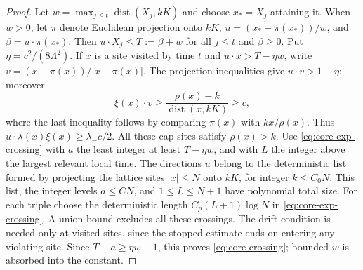 \begin{proof}
Let $w=\max_{j\leq t}\operatorname{dist}(X_j,kK)$ and choose $x_*=X_j$
attaining it. When $w>0$, let $\pi$ denote Euclidean projection onto $kK$,
$u=(x_*-\pi(x_*))/w$, and $\beta=u\cdot\pi(x_*)$.
Then $u\cdot X_j\leq T:=\beta+w$ for all $j\leq t$ and $\beta\geq0$.
Put $\eta=c^2/(8\Lambda^2)$. If $x$ is a site visited by time $t$
and $u\cdot x>T-\eta w$, write $v=(x-\pi(x))/|x-\pi(x)|$.
The projection inequalities give $u\cdot v>1-\eta$; moreover
\[
 \xi(x)\cdot v\geq
 \frac{\rho(x)-k}{\operatorname{dist}(x,kK)}\geq c,
\]
where the last inequality follows by comparing $\pi(x)$ with
$kx/\rho(x)$. Thus $u\cdot\lambda(x)\xi(x)\geq\lambda_-c/2$.
All these cap sites satisfy $\rho(x)>k$.
Use \eqref{eq:core-exp-crossing} with $a$ the least integer at least
$T-\eta w$, and with $L$ the integer above the largest relevant local time.
The directions $u$ belong to the deterministic list formed by projecting
the lattice sites $|x|\leq N$ onto $kK$, for integer $k\leq C_0N$.
This list, the integer levels $a\leq CN$, and $1\leq L\leq N+1$ have
polynomial total size. For each triple choose the deterministic length
$C_p(L+1)\log N$ in \eqref{eq:core-exp-crossing}. A union bound excludes
all these crossings. The drift condition is needed only at visited
sites, since the stopped estimate ends on entering any violating site. Since $T-a\geq\eta w-1$, this proves
\eqref{eq:core-crossing}; bounded $w$ is absorbed into the constant.
\end{proof}

